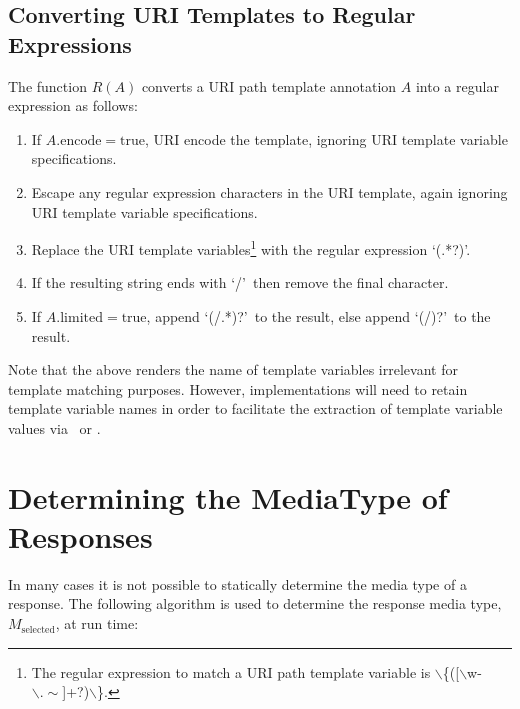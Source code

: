 \subsection{Converting URI Templates to Regular Expressions}
\label{template_to_regex}

The function $R(A)$ converts a URI path template annotation $A$ into a regular expression as follows:
\begin{enumerate}
\item If $A.\mbox{encode}=\mbox{true}$, URI encode the template, ignoring URI template variable specifications.
\item Escape any regular expression characters in the URI template, again ignoring URI template variable specifications.
\item Replace the URI template variables\footnote{The regular expression to match a URI path template variable is $\backslash$\{([$\backslash$w-$\backslash.\sim$]+?)$\backslash$\}.} with the regular expression \lq(.*?)\rq.
\item If the resulting string ends with \lq/\rq\ then remove the final character.
\item If $A.\mbox{limited}=\mbox{true}$, append \lq(/.*)?\rq\ to the result, else append \lq(/)?\rq\ to the result.
\end{enumerate}

Note that the above renders the name of template variables irrelevant for template matching purposes. However, implementations will need to retain template variable names in order to facilitate the extraction of template variable values via \PathParam\ or \UriInfo{}.

\section{Determining the MediaType of Responses}

In many cases it is not possible to statically determine the media type of a response. The following algorithm is used to determine the response media type, $M_{\mbox{selected}}$, at run time:


